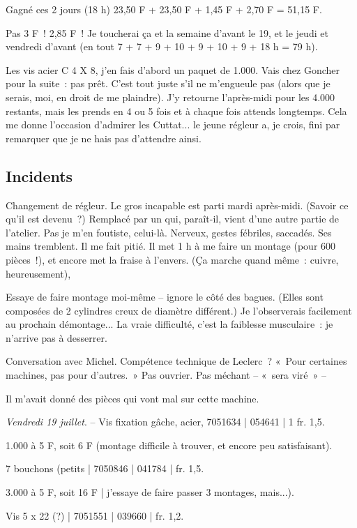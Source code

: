 \documentclass[french,twoside]{book} %
\begin{document}
Gagné ces 2 jours (18 h) 23,50 F + 23,50 F + 1,45 F + 2,70 F = 51,15 F.\par
Pas 3 F ! 2,85 F ! Je toucherai ça et la semaine d'avant le 19, et le jeudi et vendredi d'avant (en tout 7 + 7 + 9 + 10 + 9 + 10 + 9 + 18 h = 79 h).\par
Les vis acier C 4 X 8, j'en fais d'abord un paquet de 1.000. Vais chez Goncher pour la suite : pas prêt. C'est tout juste s'il ne m'engueule pas (alors que je serais, moi, en droit de me plaindre). J'y retourne l'après-midi pour les 4.000 restants, mais les prends en 4 ou 5 fois et à chaque fois attends longtemps. Cela me donne l'occasion d'admirer les Cuttat... le jeune régleur a, je crois, fini par remarquer que je ne hais pas d'attendre ainsi.
\subsection[Incidents]{Incidents}
\noindent \par
Changement de régleur. Le gros incapable est parti mardi après-midi. (Savoir ce qu'il est devenu ?) Remplacé par un qui, paraît-il, vient d'une autre partie de l'atelier. Pas je m'en foutiste, celui-là. Nerveux, gestes fébriles, saccadés. Ses mains tremblent. Il me fait pitié. Il met 1 h à me faire un montage (pour 600 pièces !), et encore met la fraise à l'envers. (Ça marche quand même : cuivre, heureusement),\par
Essaye de faire montage moi-même – ignore le côté des bagues. (Elles sont composées de 2 cylindres creux de diamètre différent.) Je l'observerais facilement au prochain démontage... La vraie difficulté, c'est la faiblesse musculaire : je n'arrive pas à desserrer.\par
Conversation avec Michel. Compétence technique de Leclerc ? « Pour certaines machines, pas pour d'autres. » Pas ouvrier. Pas méchant – « sera viré » –\par
Il m'avait donné des pièces qui vont mal sur cette machine.\par
{\itshape Vendredi 19 juillet}. – Vis fixation gâche, acier, 7051634 | 054641 | 1 fr. 1,5.\par
1.000 à 5 F, soit 6 F (montage difficile à trouver, et encore peu satisfaisant).\par
7 bouchons (petits | 7050846 | 041784 | fr. 1,5.\par
3.000 à 5 F, soit 16 F | j'essaye de faire passer 3 montages, mais...).\par
Vis 5 x 22 (?) | 7051551 | 039660 | fr. 1,2.\par
\end{document}
